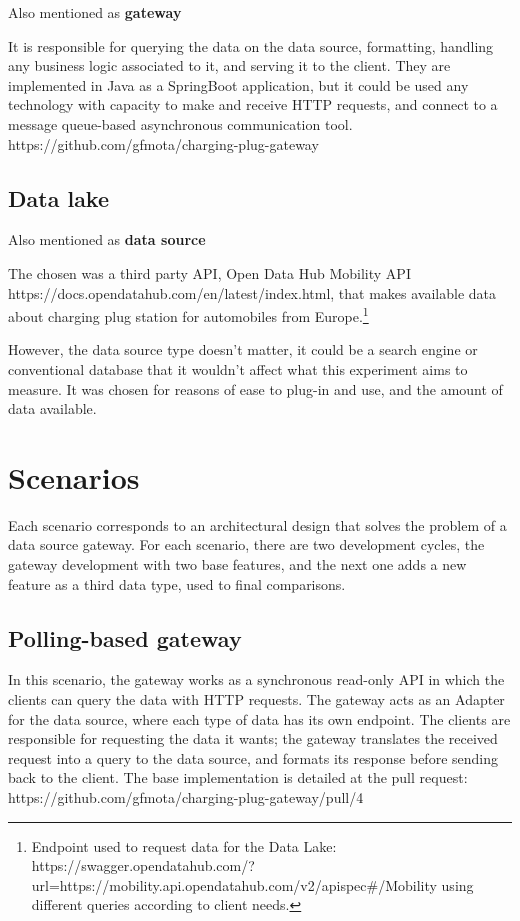 Also mentioned as \textbf{gateway}

It is responsible for querying the data on the data source, formatting, handling any business logic associated to it, and serving it to the client. They are implemented in Java as a SpringBoot application, but it could be used any technology with capacity to make and receive HTTP requests, and connect to a message queue-based asynchronous communication tool. https://github.com/gfmota/charging-plug-gateway

\subsection*{Data lake}
\label{sec:datalake}

Also mentioned as \textbf{data source}

The chosen was a third party API, Open Data Hub Mobility API https://docs.opendatahub.com/en/latest/index.html, that makes available data about charging plug station for automobiles from Europe.\footnote{Endpoint used to request data for the Data Lake: https://swagger.opendatahub.com/?url=https://mobility.api.opendatahub.com/v2/apispec#/Mobility using different queries according to client needs.}

However, the data source type doesn't matter, it could be a search engine or conventional database that it wouldn't affect what this experiment aims to measure. It was chosen for reasons of ease to plug-in and use, and the amount of data available.   

\section{Scenarios}
\label{sec:scenarios}

Each scenario corresponds to an architectural design that solves the problem of a data source gateway. For each scenario, there are two development cycles, the gateway development with two base features, and the next one adds a new feature as a third data type, used to final comparisons.

\subsection*{Polling-based gateway}
\label{sec:polling}

In this scenario, the gateway works as a synchronous read-only API in which the clients can query the data with HTTP requests. The gateway acts as an Adapter for the data source, where each type of data has its own endpoint. The clients are responsible for requesting the data it wants; the gateway translates the received request into a query to the data source, and formats its response before sending back to the client. The base implementation is detailed at the pull request: https://github.com/gfmota/charging-plug-gateway/pull/4

